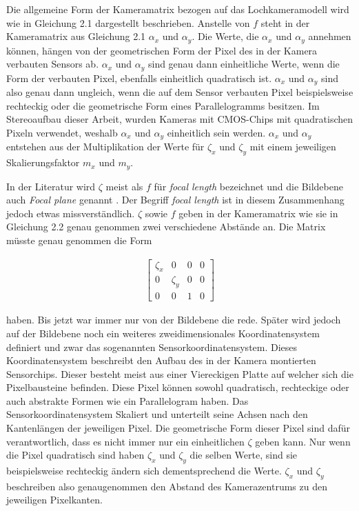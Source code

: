 Die allgemeine Form der Kameramatrix bezogen auf das Lochkameramodell wird wie in Gleichung 2.1 dargestellt beschrieben. Anstelle von $f$ steht in der Kameramatrix aus Gleichung 2.1 $\alpha_x$ und $\alpha_y$. Die Werte, die $\alpha_x$ und $\alpha_y$ annehmen können, hängen von der geometrischen Form der Pixel des in der Kamera verbauten Sensors ab\cite{HZ,Photonik}.  $\alpha_x$ und $\alpha_y$ sind genau dann einheitliche Werte, wenn die Form der verbauten Pixel, ebenfalls einheitlich quadratisch ist.
$\alpha_x$ und $\alpha_y$ sind also genau dann ungleich, wenn die auf dem Sensor verbauten Pixel beispielsweise rechteckig oder die geometrische Form eines Parallelogramms besitzen\cite{HZ}. Im Stereoaufbau dieser Arbeit, wurden Kameras mit CMOS-Chips mit quadratischen Pixeln verwendet, weshalb $\alpha_x$ und $\alpha_y$ einheitlich sein werden. $\alpha_x$ und $\alpha_y$ entstehen aus der Multiplikation der Werte für $\zeta_x$ und $\zeta_y$ mit einem jeweiligen Skalierungsfaktor $m_x$ und $m_y$. 

In der Literatur  wird $\zeta$ meist als $f$ für \textit{focal length} bezeichnet und die Bildebene auch \textit{Focal plane} genannt \cite{HZ}. Der Begriff \textit{focal length} ist in diesem Zusammenhang jedoch etwas missverständlich. $\zeta$ sowie $f$ geben in der Kameramatrix wie sie in Gleichung 2.2 genau genommen zwei verschiedene Abstände an. Die Matrix müsste genau genommen die Form

\begin{gather*}
\begin{bmatrix}
\zeta_x&0&0&0\\
0&\zeta_y&0&0\\
0&0&1&0
\end{bmatrix}
\end{gather*}

haben. Bis jetzt war immer nur von der Bildebene die rede. Später wird jedoch auf der Bildebene noch ein weiteres zweidimensionales Koordinatensystem definiert und zwar das sogenannten Sensorkoordinatensystem. Dieses Koordinatensystem beschreibt den Aufbau des in der Kamera montierten Sensorchips. Dieser besteht meist aus einer Viereckigen Platte auf welcher sich die Pixelbausteine befinden. Diese Pixel können sowohl quadratisch, rechteckige oder auch abstrakte Formen wie ein Parallelogram haben. Das Sensorkoordinatensystem Skaliert und unterteilt seine Achsen nach den Kantenlängen der jeweiligen Pixel. Die geometrische Form dieser Pixel sind dafür verantwortlich, dass es nicht immer nur ein einheitlichen $\zeta$ geben kann. Nur wenn die Pixel quadratisch sind haben  $\zeta_x$ und $\zeta_y$ die selben Werte, sind sie beispielsweise rechteckig ändern sich dementsprechend die Werte. $\zeta_x$ und $\zeta_y$ beschreiben also genaugenommen den Abstand des Kamerazentrums zu den jeweiligen Pixelkanten.\\

